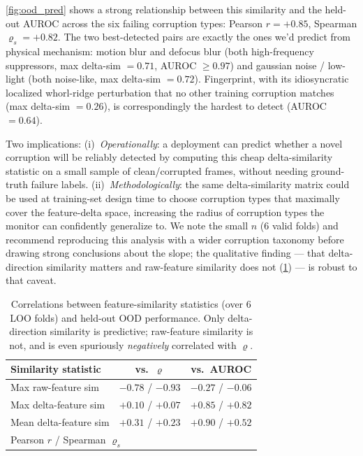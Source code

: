 \documentclass[letterpaper]{IEEEtran}
\renewcommand{\rho}{\varrho}
\begin{document}
\cref{fig:ood_pred} shows a strong relationship between this similarity and the held-out AUROC across the six failing corruption types: Pearson $r = +0.85$, Spearman $\rho_s = +0.82$.
The two best-detected pairs are exactly the ones we'd predict from physical mechanism: motion blur and defocus blur (both high-frequency suppressors, max delta-sim $= 0.71$, AUROC $\geq 0.97$) and gaussian noise / low-light (both noise-like, max delta-sim $= 0.72$).
Fingerprint, with its idiosyncratic localized whorl-ridge perturbation that no other training corruption matches (max delta-sim $= 0.26$), is correspondingly the hardest to detect (AUROC $= 0.64$).

Two implications:
(i)~\emph{Operationally}: a deployment can predict whether a novel corruption will be reliably detected by computing this cheap delta-similarity statistic on a small sample of clean/corrupted frames, without needing ground-truth failure labels.
(ii)~\emph{Methodologically}: the same delta-similarity matrix could be used at training-set design time to choose corruption types that maximally cover the feature-delta space, increasing the radius of corruption types the monitor can confidently generalize to.
We note the small $n$ (6 valid folds) and recommend reproducing this analysis with a wider corruption taxonomy before drawing strong conclusions about the slope; the qualitative finding --- that delta-direction similarity matters and raw-feature similarity does not (\cref{tab:sim_correlations}) --- is robust to that caveat.

\begin{table}[t]
\centering
\caption{Correlations between feature-similarity statistics (over 6 LOO folds) and held-out OOD performance. Only delta-direction similarity is predictive; raw-feature similarity is not, and is even spuriously \emph{negatively} correlated with $\rho$.}
\label{tab:sim_correlations}
\footnotesize
\setlength{\tabcolsep}{4pt}
\begin{tabular}{@{}lcc@{}}
\toprule
\textbf{Similarity statistic} & \textbf{vs.\ $\rho$} & \textbf{vs.\ AUROC} \\
\midrule
Max raw-feature sim    & $-0.78$ / $-0.93$ & $-0.27$ / $-0.06$ \\
Max delta-feature sim  & $+0.10$ / $+0.07$ & $\mathbf{+0.85}$ / $\mathbf{+0.82}$ \\
Mean delta-feature sim & $+0.31$ / $+0.23$ & $\mathbf{+0.90}$ / $+0.52$ \\
\bottomrule
\multicolumn{3}{l}{\footnotesize Pearson $r$ / Spearman $\rho_s$} \\
\end{tabular}
\end{table}
\end{document}
